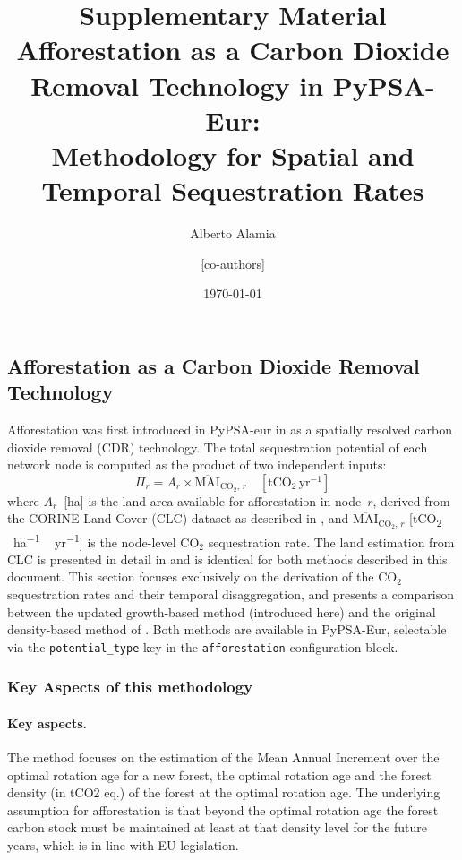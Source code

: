 \documentclass[12pt, a4paper]{article}
\title{%
    \textbf{Supplementary Material}\\[0.5em]
    \large Afforestation as a Carbon Dioxide Removal Technology in PyPSA-Eur:\\
    Methodology for Spatial and Temporal Sequestration Rates
}
\author{Alberto Alamia \and [co-authors]}
\date{\today}
\begin{document}
\maketitle
\tableofcontents
\newpage

\subsection{Afforestation as a Carbon Dioxide Removal Technology}
\label{sec:afforestation_methodology}

Afforestation was first introduced in PyPSA-eur in \cite{Fernandes2026} as a spatially resolved carbon dioxide removal (CDR) technology. The total sequestration potential of each network node is computed as the product of two independent inputs:
\begin{equation}
    \Pi_r = A_r \times \overline{\text{MAI}}_{\text{CO}_2,\, r}
    \quad [\text{tCO}_2\,\text{yr}^{-1}]
    \label{eq:node_potential}
\end{equation}
where $A_r$~[\si{ha}] is the land area available for afforestation in node~$r$, derived from the CORINE Land Cover (CLC) dataset as described in \citet{Fernandes2026}, and $\overline{\text{MAI}}_{\text{CO}_2,\,r}$ [\si{tCO_2\,ha^{-1}\,yr^{-1}}]
is the node-level CO$_2$ sequestration rate. The land estimation from CLC is presented in detail in \citet{Fernandes2026} and is identical for both methods described in this document. This section focuses exclusively on the derivation of the CO$_2$ sequestration rates and their temporal disaggregation, and presents a comparison between the updated growth-based method (introduced here) and the original density-based method of \citet{Fernandes2026}. Both methods are available in PyPSA-Eur, selectable via the
\texttt{potential\_type} key in the \texttt{afforestation} configuration block.

\subsubsection{Key Aspects of this methodology}
\label{sec:key_aspects}

\paragraph{Key aspects.}
The method focuses on the estimation of the Mean Annual Increment over the optimal rotation age for a new forest, the optimal rotation age and the forest density (in tCO2 eq.) of the forest at the optimal rotation age.
The underlying assumption for afforestation is that beyond the optimal rotation age the forest carbon stock must be maintained at least at that density level for the future years, which is in line with EU legislation.
\end{document}
